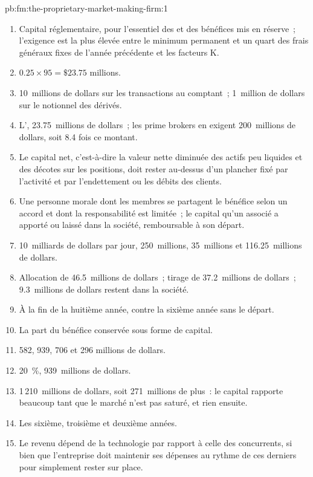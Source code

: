 \begin{solution}{pb:fm:the-proprietary-market-making-firm:1}
\begin{enumerate}
\item Capital réglementaire, pour l'essentiel des  et des bénéfices mis en réserve~; l'exigence est la plus élevée entre le minimum permanent et un quart
des frais généraux fixes de l'année précédente et les facteurs K.
\item $0.25\times95=\$23.75$ millions.
\item 10~millions de dollars sur les transactions au comptant~; 1~million de dollars sur le notionnel des dérivés.
\item L', 23.75~millions de dollars~; les prime brokers en exigent 200~millions de dollars, soit 8.4 fois ce montant.
\item Le capital net, c'est-à-dire la valeur nette diminuée des actifs peu liquides et des décotes sur les positions, doit rester au-dessus d'un plancher fixé par l'activité et par l'endettement ou
les débits des clients.
\item Une personne morale dont les membres se partagent le bénéfice selon un accord et dont la responsabilité est limitée~; le capital qu'un associé a apporté ou laissé dans
la société, remboursable à son départ.
\item 10~milliards de dollars par jour, 250~millions, 35~millions et 116.25~millions de dollars.
\item Allocation de 46.5~millions de dollars~; tirage de 37.2~millions de dollars~; 9.3~millions de dollars restent dans la société.
\item À la fin de la huitième année, contre la sixième année sans le départ.
\item La part du bénéfice conservée sous forme de capital.
\item 582, 939, 706 et 296 millions de dollars.
\item 20~\%, 939~millions de dollars.
\item 1\,210~millions de dollars, soit 271~millions de plus~: le capital rapporte beaucoup tant que le marché n'est pas saturé, et rien ensuite.
\item Les sixième, troisième et deuxième années.
\item Le revenu dépend de la technologie par rapport à celle des concurrents, si bien que l'entreprise doit maintenir ses dépenses au rythme de ces derniers pour simplement rester sur place.

\end{enumerate}
\end{solution}

